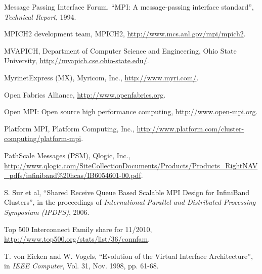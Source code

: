 \documentclass[conference]{IEEEtran}
\begin{document}
\begin{thebibliography}{30}
Message Passing Interface Forum. ``MPI: A message-passing interface standard'',
\emph{Technical Report}, 1994.

MPICH2 development team, MPICH2, \url{http://www.mcs.anl.gov/mpi/mpich2}.

MVAPICH, Department of Computer Science and Engineering, Ohio State University,
\url{http://mvapich.cse.ohio-state.edu/}.

MyrinetExpress (MX), Myricom, Inc., \url{http://www.myri.com/}.

Open Fabrics Alliance, \url{http://www.openfabrics.org}.

Open MPI: Open source high performance computing, \url{http://www.open-mpi.org}.

Platform MPI, Platform Computing, Inc.,
\url{http://www.platform.com/cluster-computing/platform-mpi}.

PathScale Messages (PSM), Qlogic, Inc.,
\url{http://www.qlogic.com/SiteCollectionDocuments/Products/Products_RightNAV_pdfs/infiniband%20hcas/IB6054601-00.pdf}.

S. Sur et al, ``Shared Receive Queue Based Scalable MPI Design for InfiniBand Clusters'',
in the proceedings of \emph{International Parallel and Distributed Processing Symposium
(IPDPS)}, 2006.

Top 500 Interconnect Family share for 11/2010,
\url{http://www.top500.org/stats/list/36/connfam}.

T. von Eicken and W. Vogels, ``Evolution of the Virtual Interface Architecture'', in
\emph{IEEE Computer}, Vol. 31, Nov. 1998, pp. 61-68. 




\end{thebibliography}

\end{document}
